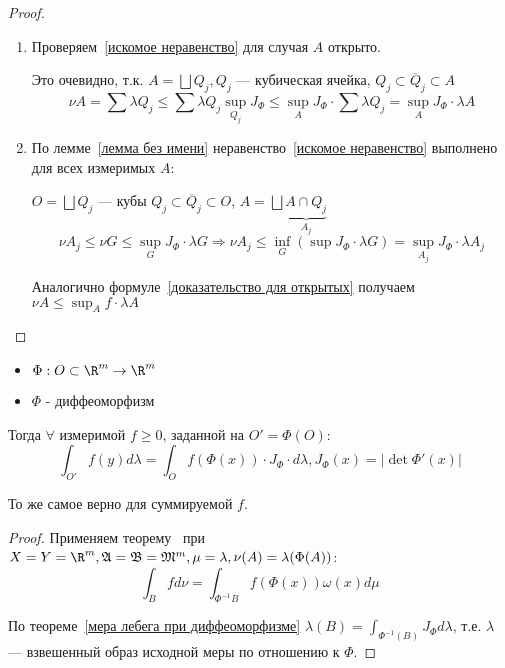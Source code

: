 \begin{proof}
\begin{enumerate}
        \item Проверяем~\eqref{искомое неравенство} для случая \(A\) открыто.

              Это очевидно, т.к. \(A = \bigsqcup Q_j, Q_j\) --- кубическая ячейка, \(Q_j \subset \overline Q_j \subset A\)
              \begin{equation}
                  \nu A = \sum \lambda Q_j \leq \sum \lambda Q_j \sup_{Q_j} J_\Phi \leq \sup_A J_\Phi \cdot \sum \lambda Q_j = \sup_A J_\Phi \cdot \lambda A \label{доказательство для открытых}
              \end{equation}

        \item По лемме~\ref{лемма без имени} неравенство~\eqref{искомое неравенство} выполнено для всех измеримых \(A\):

              \(O = \bigsqcup Q_j\) --- кубы \(Q_j \subset \overline Q_j \subset O\), \(A = \bigsqcup \underbrace{A \cap Q_j}_{A_j}\)
              \[\nu A_j \leq \nu G \leq \sup_G J_\Phi \cdot \lambda G \Rightarrow \nu A_j \leq \inf_G (\sup J_\Phi \cdot \lambda G) = \sup_{A_j} J_\Phi \cdot \lambda A_j\]

              Аналогично формуле~\eqref{доказательство для открытых} получаем \(\nu A \leq \sup_A f \cdot \lambda A\)
    \end{enumerate}
\end{proof}

\begin{theorem}\itemfix
    \begin{itemize}
        \item \(\Phi : O \subset \R^m \to \R^m\)
        \item \(\Phi\) - диффеоморфизм
    \end{itemize}

    Тогда \(\forall\) измеримой \(f \geq 0\), заданной на \(O' = \Phi(O)\):
    \[\int_{O'} f(y)d\lambda = \int_O f(\Phi(x)) \cdot J_\Phi \cdot d \lambda, J_\Phi(x) = |\det \Phi'(x)|\]

    То же самое верно для суммируемой \(f\).
\end{theorem}
\begin{proof}
    Применяем теорему~ при \(X = Y = \R^m, \mathfrak{A} = \mathfrak{B} = \mathfrak{M}^m, \mu = \lambda, \nu(A) = \lambda(\Phi(A))\):
    \[\int_B f d\nu = \int_{\Phi^{-1}B} f(\Phi(x)) \omega(x) d\mu\]

    По теореме~\ref{мера лебега при диффеоморфизме} \(\lambda(B) = \int_{\Phi^{-1}(B)} J_\Phi d \lambda\), т.е. \(\lambda\) --- взвешенный образ исходной меры по отношению к \(\Phi\).
\end{proof}

